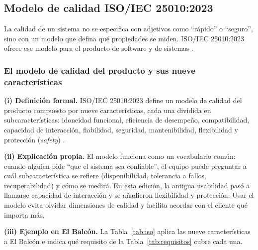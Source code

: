 \subsection{Modelo de calidad ISO/IEC 25010:2023}

La calidad de un sistema no se especifica con adjetivos como ``r\'apido'' o ``seguro'', sino con un modelo que defina qu\'e propiedades se miden. ISO/IEC 25010:2023 ofrece ese modelo para el producto de software y de sistemas \cite{iso25010}.

\subsubsection{El modelo de calidad del producto y sus nueve caracter\'isticas}
\textbf{(i) Definici\'on formal.} ISO/IEC 25010:2023 define un modelo de calidad del producto compuesto por nueve caracter\'isticas, cada una dividida en subcaracter\'isticas: idoneidad funcional, eficiencia de desempe\~no, compatibilidad, capacidad de interacci\'on, fiabilidad, seguridad, mantenibilidad, flexibilidad y protecci\'on (\emph{safety}) \cite{iso25010}. %
\par
\textbf{(ii) Explicaci\'on propia.} El modelo funciona como un vocabulario com\'un: cuando alguien pide ``que el sistema sea confiable'', el equipo puede preguntar a cu\'al subcaracter\'istica se refiere (disponibilidad, tolerancia a fallos, recuperabilidad) y c\'omo se medir\'a. En esta edici\'on, la antigua usabilidad pas\'o a llamarse capacidad de interacci\'on y se a\~nadieron flexibilidad y protecci\'on. Usar el modelo evita olvidar dimensiones de calidad y facilita acordar con el cliente qu\'e importa m\'as.\par
\textbf{(iii) Ejemplo en El Balc\'on.} La Tabla~\ref{tab:iso} aplica las nueve caracter\'isticas a El Balc\'on e indica qu\'e requisito de la Tabla~\ref{tab:requisitos} cubre cada una.\par

